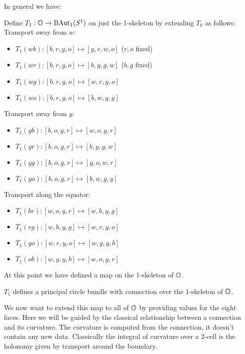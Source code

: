 In general we have:

\begin{mydef}
Define \( T_1:\mathbb{O}\to\mathrm{BAut}_1(S^1) \) on just the 1-skeleton by extending \( T_0 \) as follows:
Transport away from \( w \):
\begin{itemize}
\item \( T_1(wb):[b, r, g, o]\mapsto [y, r, w, o] \) (\( r, o \) fixed)
\item \( T_1(wr):[b, r, g, o]\mapsto [b, y, g, w] \) (\( b, g \) fixed)
\item \( T_1(wg):[b, r, g, o]\mapsto [w, r, y, o] \)
\item \( T_1(wo):[b, r, g, o]\mapsto [b, w, g, y] \)
\end{itemize}
Transport away from \( y \):
\begin{itemize}
\item \( T_1(yb):[b, o, g, r]\mapsto [w, o, y, r] \)
\item \( T_1(yr):[b, o, g, r]\mapsto [b, y, g, w] \)
\item \( T_1(yg):[b, o, g, r]\mapsto [y, o, w, r] \)
\item \( T_1(yo):[b, o, g, r]\mapsto [b, w, g, y] \)
\end{itemize}
Transport along the equator:
\begin{itemize}
\item \( T_1(br):[w, o, y, r]\mapsto [w, b, y, g] \) 
\item \( T_1(rg):[w, b, y, g]\mapsto [w, r, y, o] \)
\item \( T_1(go):[w, r, y, o]\mapsto [w, g, y, b] \)
\item \( T_1(ob):[w, g, y, b]\mapsto [w, o, y, r] \)
\end{itemize}
\end{mydef}

At this point we have defined a map on the 1-skeleton of \(\mathbb{O}\).

\begin{myclaim}
\( T_1 \) defines a principal circle bundle with connection over the 1-skeleton of \( \mathbb{O} \).
\end{myclaim}

We now want to extend this map to all of \(\mathbb{O}\) by providing values for
the eight faces. Here we will be guided by the classical relationship
between a connection and its curvature. The curvature is computed from
the connection, it doesn't contain any new data. Classically the
integral of curvature over a 2-cell is the holonomy given by transport
around the boundary.

